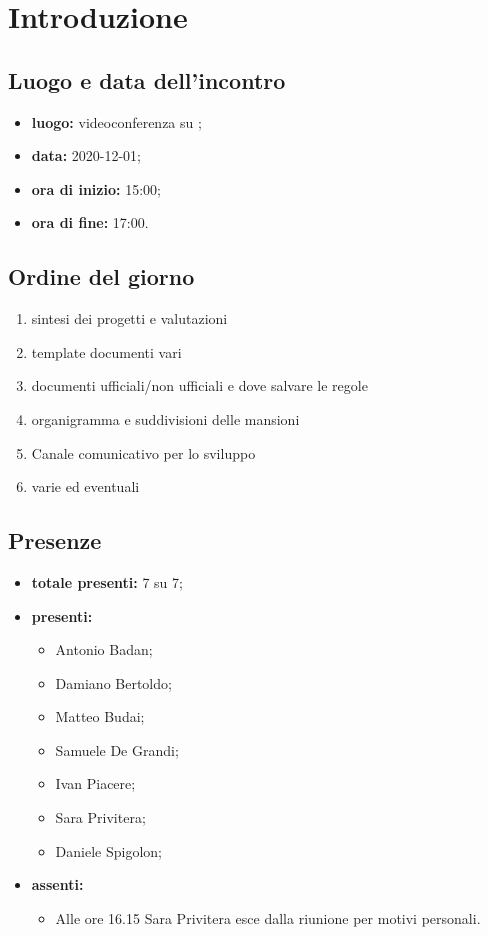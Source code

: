 \section*{Introduzione}

\subsection*{Luogo e data dell'incontro}
	\begin{itemize}
		\item \textbf{luogo:} videoconferenza su ;
		\item \textbf{data:} 2020-12-01;
		\item \textbf{ora di inizio:} 15:00;
		\item \textbf{ora di fine:} 17:00.
	\end{itemize}

\subsection*{Ordine del giorno}
	\begin{enumerate}
			\item sintesi dei progetti e valutazioni
			\item template documenti vari
			\item documenti ufficiali/non ufficiali e dove salvare le regole
			\item organigramma e suddivisioni delle mansioni
			\item Canale comunicativo per lo sviluppo
			\item varie ed eventuali
	\end{enumerate}

\subsection*{Presenze}
	\begin{itemize}
		\item \textbf{totale presenti:} 7 su 7;
		\item \textbf{presenti: }
			\begin{itemize}
				\item Antonio Badan;
				\item Damiano Bertoldo;
				\item Matteo Budai;
				\item Samuele De Grandi;
				\item Ivan Piacere;
				\item Sara Privitera;
				\item Daniele Spigolon;
			\end{itemize}
		\item \textbf{assenti: }
			\begin{itemize}
				\item Alle ore 16.15 Sara Privitera esce dalla riunione per motivi personali.
			\end{itemize}
	\end{itemize}


